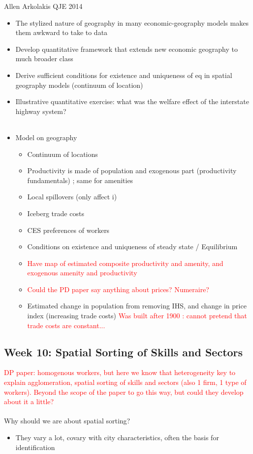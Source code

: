 \documentclass[10pt, final]{article}
\begin{document}
Allen Arkolakis QJE 2014
\begin{itemize}
    \item The stylized nature of geography in many economic-geography models makes them awkward to take to data
    \item Develop quantitative framework that extends new economic geography to much broader class
    \item Derive sufficient conditions for existence and uniqueness of eq in spatial geography models (continuum of location)
    \item Illustrative quantitative exercise: what was the welfare effect of the interstate highway system?
    \\
    \\
    \item Model on geography
    \begin{itemize}
        \item Continuum of locations
        \item Productivity is made of population and exogenous part (productivity fundamentals) ; same for amenities
        \item Local spillovers (only affect i)
        \item Iceberg trade costs
        \item CES preferences of workers
        \item Conditions on existence and uniqueness of steady state / Equilibrium
        \item \textcolor{red}{Have map of estimated composite productivity and amenity, and exogenous amenity and productivity}
        \item \textcolor{red}{Could the PD paper say anything about prices? Numeraire?}
        \item Estimated change in population from removing IHS, and change in price index (increasing trade costs) \textcolor{red}{Was built after 1900 : cannot pretend that trade costs are constant...}
    \end{itemize}
\end{itemize}


\subsection{Week 10: Spatial Sorting of Skills and Sectors} %
\label{sub:week_10_spatial_sorting_of_skills_and_sectors}

\textcolor{red}{DP paper: homogenous workers, but here we know that heterogeneity key to explain agglomeration, spatial sorting of skills and sectors (also 1 firm, 1 type of workers). Beyond the scope of the paper to go this way, but could they develop about it a little? }
\\
\\
Why should we are about spatial sorting?
\begin{itemize}
    \item They vary a lot, covary with city characteristics, often the basis for identification
\end{itemize}
\end{document}
